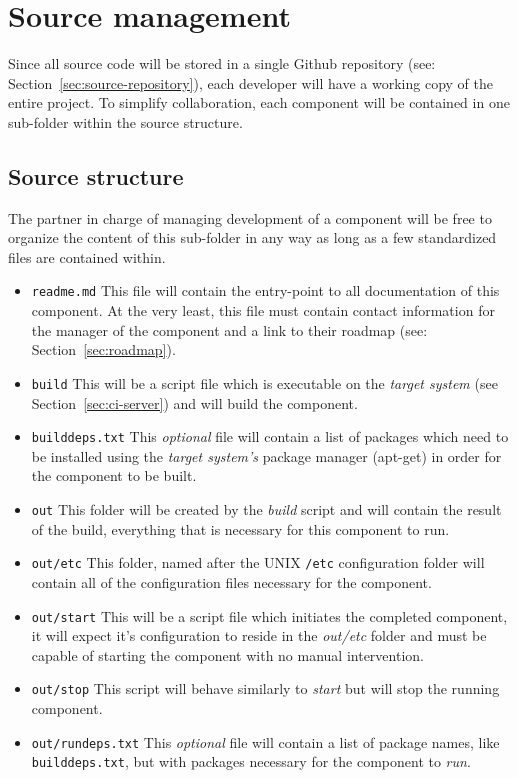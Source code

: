 \section{Source management}
\label{sec:source-management}

Since all source code will be stored in a single Github repository
(see: Section~\ref{sec:source-repository}), each developer will have a working copy of the entire
project. To simplify collaboration, each component will be contained in one sub-folder within the
source structure.

\subsection{Source structure}
\label{sec:source-structure}
The partner in charge of managing development of a component will be free to organize the content
of this sub-folder in any way as long as a few standardized files are contained within.

\begin{itemize}
\item \texttt{readme.md} This file will contain the entry-point to all documentation of this
component. At the very least, this file must contain contact information for the manager of
the component and a link to their roadmap (see: Section~\ref{sec:roadmap}).
\item \texttt{build} This will be a script file which is executable on the \emph{target system}
(see Section~\ref{sec:ci-server}) and will build the component.
\item \texttt{builddeps.txt} This \emph{optional} file will contain a list of packages which
need to be installed using the \emph{target system's} package manager (apt-get) in order for
the component to be built.
\item \texttt{out} This folder will be created by the \emph{build} script and will contain the
result of the build, everything that is necessary for this component to run.
\item \texttt{out/etc} This folder, named after the UNIX \texttt{/etc} configuration folder will
contain all of the configuration files necessary for the component.
\item \texttt{out/start} This will be a script file which initiates the completed component, it will
expect it's configuration to reside in the \emph{out/etc} folder and must be capable of starting
the component with no manual intervention.
\item \texttt{out/stop} This script will behave similarly to \emph{start} but will stop the running
component.
\item \texttt{out/rundeps.txt} This \emph{optional} file will contain a list of package names,
like \texttt{builddeps.txt}, but with packages necessary for the component to \emph{run}.
\end{itemize}

